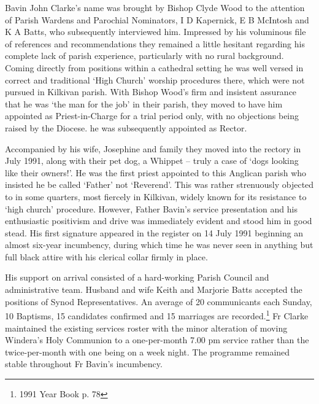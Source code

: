 Bavin John Clarke's name was brought by Bishop Clyde Wood to the attention of Parish Wardens and Parochial Nominators, I D Kapernick, E B McIntosh and K A Batts, who subsequently interviewed him. Impressed by his voluminous file of references and recommendations they remained a little hesitant regarding his complete lack of parish experience, particularly with no rural background. Coming directly from positions within a cathedral setting he was well versed in correct and traditional `High Church' worship procedures there, which were not pursued in Kilkivan parish. With Bishop Wood's firm and insistent assurance that he was `the man for the job' in their parish, they moved to have him appointed as Priest-in-Charge for a trial period only, with no objections being raised by the Diocese. he was subsequently appointed as Rector.



Accompanied by his wife, Josephine and family they moved into the rectory in July 1991, along with their pet dog, a Whippet -- truly a case of `dogs looking like their owners!'. He was the first priest appointed to this Anglican parish who insisted he be called `Father' not `Reverend'. This was rather strenuously objected to in some quarters, most fiercely in Kilkivan, widely known for its resistance to `high church' procedure. However, Father Bavin's service presentation and his enthusiastic positivism and drive was immediately evident and stood him in good stead. His first signature appeared in the register on 14 July 1991 beginning an almost six-year incumbency, during which time he was never seen in anything but full black attire with his clerical collar firmly in place.



His support on arrival consisted of a hard-working Parish Council and administrative team. Husband and wife Keith and Marjorie Batts accepted the positions of Synod Representatives. An average of 20 communicants each Sunday, 10 Baptisms, 15 candidates confirmed and 15 marriages are recorded.\footnote{1991 Year Book p. 78} Fr Clarke maintained the existing services roster with the minor alteration of moving Windera's Holy Communion to a one-per-month 7.00 pm service rather than the twice-per-month with one being on a week night. The programme remained stable throughout Fr Bavin's incumbency.


